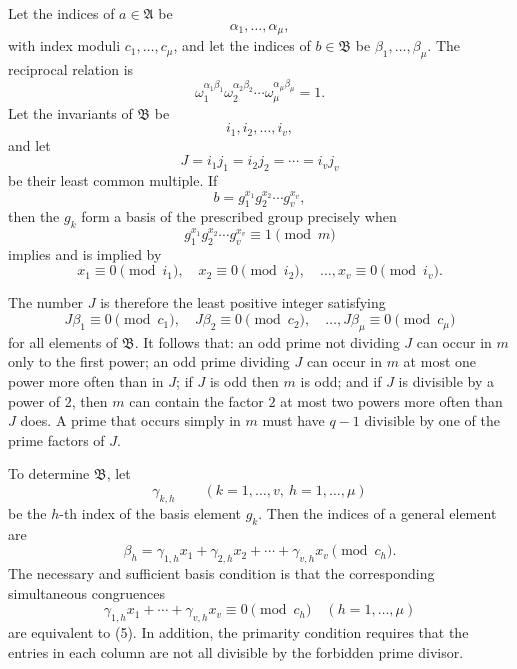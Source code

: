 \documentclass[11pt]{article}
\providecommand{\grpA}{\mathfrak A}
\providecommand{\grpB}{\mathfrak B}
\begin{document}
Let the indices of $a\in\grpA$ be
\[
 \alpha_1,
\ldots,\alpha_\mu,
\]
with index moduli $c_1,
\ldots,c_\mu$, and let the indices of $b\in\grpB$ be $\beta_1,
\ldots,
\beta_\mu$. The reciprocal relation is
\begin{equation}
 \omega_1^{\alpha_1\beta_1}\omega_2^{\alpha_2\beta_2}
 \cdots\omega_\mu^{\alpha_\mu\beta_\mu}=1.
\tag{1}
\end{equation}
Let the invariants of $\grpB$ be
\[
 i_1,i_2,
\ldots,i_v,
\]
and let
\begin{equation}
 J=i_1j_1=i_2j_2=\cdots=i_vj_v
\tag{2}
\end{equation}
be their least common multiple. If
\[
 b=g_1^{x_1}g_2^{x_2}\cdots g_v^{x_v},
\tag{3}
\]
then the $g_k$ form a basis of the prescribed group precisely when
\begin{equation}
 g_1^{x_1}g_2^{x_2}\cdots g_v^{x_v}\equiv1\pmod m
\tag{4}
\end{equation}
implies and is implied by
\begin{equation}
 x_1\equiv0\pmod {i_1},\quad
 x_2\equiv0\pmod {i_2},\quad\ldots,
 x_v\equiv0\pmod {i_v}.
\tag{5}
\end{equation}

The number $J$ is therefore the least positive integer satisfying
\begin{equation}
 J\beta_1\equiv0\pmod {c_1},\quad
 J\beta_2\equiv0\pmod {c_2},\quad\ldots,
 J\beta_\mu\equiv0\pmod {c_\mu}
\tag{6}
\end{equation}
for all elements of $\grpB$. It follows that: an odd prime not dividing $J$ can occur in $m$ only to the first power; an odd prime dividing $J$ can occur in $m$ at most one power more often than in $J$; if $J$ is odd then $m$ is odd; and if $J$ is divisible by a power of $2$, then $m$ can contain the factor $2$ at most two powers more often than $J$ does. A prime that occurs simply in $m$ must have $q-1$ divisible by one of the prime factors of $J$.

To determine $\grpB$, let
\[
 \gamma_{k,h}\qquad (k=1,
\ldots,v,
\ h=1,
\ldots,
\mu)
\]
be the $h$-th index of the basis element $g_k$. Then the indices of a general element are
\begin{equation}
 \beta_h=\gamma_{1,h}x_1+\gamma_{2,h}x_2+\cdots+\gamma_{v,h}x_v\pmod {c_h}.
\tag{8}
\end{equation}
The necessary and sufficient basis condition is that the corresponding simultaneous congruences
\begin{equation}
 \gamma_{1,h}x_1+\cdots+\gamma_{v,h}x_v\equiv0\pmod {c_h}
\quad(h=1,
\ldots,
\mu)
\tag{9}
\end{equation}
are equivalent to (5). In addition, the primarity condition requires that the entries in each column are not all divisible by the forbidden prime divisor.
\end{document}
